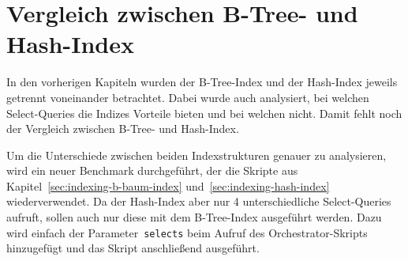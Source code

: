 \section{Vergleich zwischen B-Tree- und Hash-Index}\label{sec:indexing-comp-b-tree-hash-index}

In den vorherigen Kapiteln wurden der B-Tree-Index und der Hash-Index jeweils getrennt voneinander betrachtet.
Dabei wurde auch analysiert, bei welchen Select-Queries die Indizes Vorteile bieten und bei welchen nicht.
Damit fehlt noch der Vergleich zwischen B-Tree- und Hash-Index.

Um die Unterschiede zwischen beiden Indexstrukturen genauer zu analysieren, wird ein neuer Benchmark durchgeführt, der die Skripte aus Kapitel~\ref{sec:indexing-b-baum-index} und~\ref{sec:indexing-hash-index} wiederverwendet.
Da der Hash-Index aber nur 4 unterschiedliche Select-Queries aufruft, sollen auch nur diese mit dem B-Tree-Index ausgeführt werden.
Dazu wird einfach der Parameter~\texttt{selects} beim Aufruf des Orchestrator-Skripts hinzugefügt und das Skript anschließend ausgeführt.

